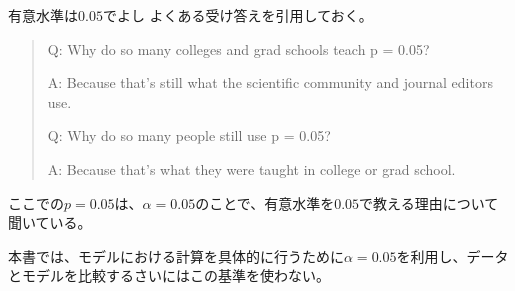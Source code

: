 \begin{SMbox}{有意水準は$0.05$でよし}
    よくある受け答えを引用しておく\cite{greenland2016statistical}。
    \begin{quote}
        Q: Why do so many colleges and grad schools teach p = 0.05?

        A: Because that's still what the scientific community and journal editors use.

        Q: Why do so many people still use p = 0.05?

        A: Because that's what they were taught in college or grad school.
    \end{quote}
 ここでの$p=0.05$は、$\alpha=0.05$のことで、有意水準を$0.05$で教える理由について聞いている。

本書では、モデルにおける計算を具体的に行うために$\alpha=0.05$を利用し、データとモデルを比較するさいにはこの基準を使わない。
\end{SMbox}